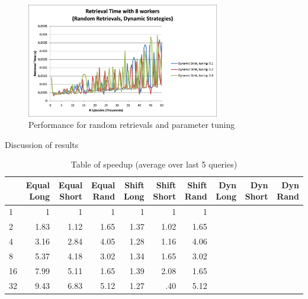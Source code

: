 \documentclass[11pt]{article} %
\begin{document}
\begin{figure}[h]
\caption{Performance for random retrievals and parameter tuning}
\centering
\includegraphics[width=0.75\textwidth]{images/alldynamicrand}
\end{figure}

Discussion of results

\begin{table}[h]
\caption{Table of speedup (average over last 5 queries)}
\centering
    \begin{tabular}{|l|r|r|r|r|r|r|r|r|r|}
        \hline
        ~  & Equal Long & Equal Short & Equal Rand & Shift Long & Shift Short & Shift Rand & Dyn Long & Dyn Short & Dyn Rand \\ \hline
        1  & 1          & 1                  & 1               & 1            & 1        & 1      & ~          & ~         & ~        \\  \hline
        2  & 1.83          & 1.12           & 1.65           & 1.37         & 1.02       & 1.65         & ~        & ~         & ~        \\ \hline
        4  & 3.16          & 2.84           & 4.05           & 1.28         & 1.16        & 4.06        & ~        & ~         & ~        \\ \hline
        8  & 5.37          & 4.18          & 3.02         & 1.34         & 1.65        & 3.02        & ~        & ~         & ~        \\ \hline
        16 & 7.99          & 5.11           & 1.65          & 1.39         & 2.08       & 1.65         & ~        & ~         & ~        \\ \hline
        32 & 9.43          & 6.83          & 5.12          & 1.27         & .40        & 5.12        & ~        & ~         & ~        \\
        \hline
    \end{tabular}
\end{table}
\end{document}
